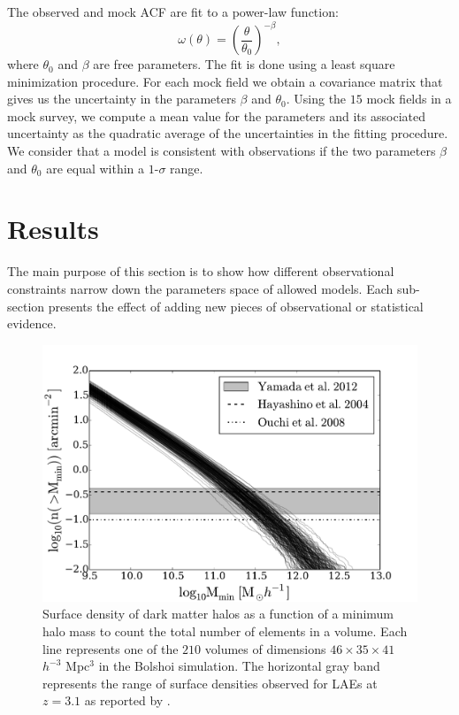 \documentclass[usenatbib]{mn2e}
\begin{document}
The observed and mock ACF are fit to a power-law function:
\begin{equation}
\omega(\theta) = \left(\frac{\theta}{\theta_{0}}\right)^{-\beta}, 
\label{eq:fitting}
\end{equation}
where $\theta_0$ and $\beta$ are free parameters. The fit is done
using a least square minimization procedure. For each mock field we obtain a
covariance matrix that gives us the uncertainty in the parameters $\beta$ and
$\theta_0$. Using the $15$ mock fields in a mock survey, we compute a
mean value for the parameters and its associated uncertainty as the
quadratic average of the uncertainties in the fitting procedure. We
consider that a model is consistent with observations if the two
parameters $\beta$ and $\theta_0$ are equal within a $1$-$\sigma$
range.   



 
\section{Results}
\label{sec:results}

The main purpose of this section is to show how different
observational constraints narrow down the parameters space of allowed
models. Each sub-section presents the effect of adding new pieces of
observational or statistical evidence. 

\begin{figure}
\begin{center}
\includegraphics[width=1.10\linewidth,angle=0]{Fig1.pdf}
\caption{ \label{fig:halos} Surface density of dark
  matter halos as a function of a minimum halo mass to count the
  total number of elements in a volume. Each line represents one of the
  $210$ volumes of dimensions $46\times 35\times 41$ $h^{-3}$ Mpc$^{3}$
  in the Bolshoi simulation. The horizontal gray band represents the
  range of surface densities observed for LAEs at $z=3.1$ as reported
  by \citep{Yamada2012}.}
\end{center} 
\end{figure}
\end{document}
